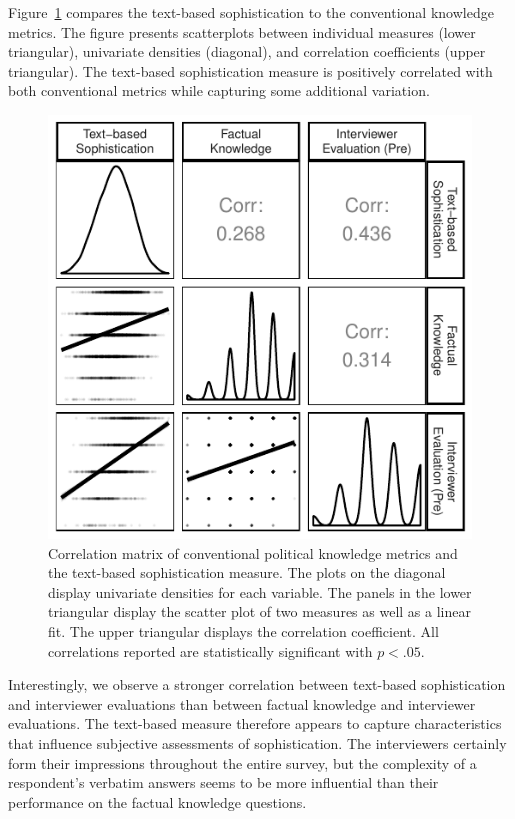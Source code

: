 \documentclass[12pt]{article}
\begin{document}

Figure~\ref{fig:corplot} compares the text-based sophistication to the conventional knowledge metrics. The figure presents scatterplots between individual measures (lower triangular), univariate densities (diagonal), and correlation coefficients (upper triangular). The text-based sophistication measure is positively correlated with both conventional metrics while capturing some additional variation.

\begin{figure}[h]\centering
\includegraphics{../fig/corplot_pres.pdf}
\caption{Correlation matrix of conventional political knowledge metrics and the text-based sophistication measure. The plots on the diagonal display univariate densities for each variable. The panels in the lower triangular display the scatter plot of two measures as well as a linear fit. The upper triangular displays the correlation coefficient. All correlations reported are statistically significant with $p<.05$.}\label{fig:corplot}
\end{figure}

Interestingly, we observe a stronger correlation between text-based sophistication and interviewer evaluations than between factual knowledge and interviewer evaluations. The text-based measure therefore appears to capture characteristics that influence subjective assessments of sophistication. The interviewers certainly form their impressions throughout the entire survey, but the complexity of a respondent's verbatim answers seems to be more influential than their performance on the factual knowledge questions.
\end{document}
